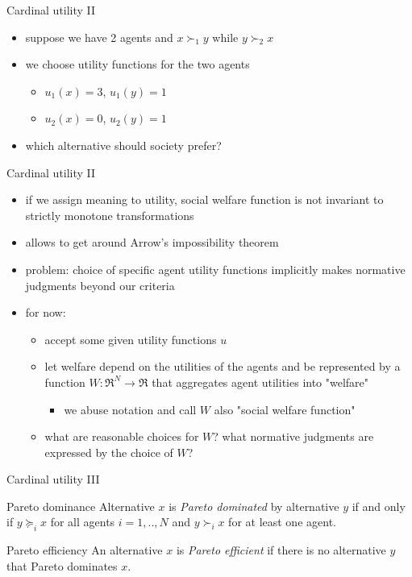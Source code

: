 \documentclass[bigger]{beamer}
\begin{document}
\begin{frame}[label={sec:org4cc0d3b}]{Cardinal utility II}
\begin{itemize}
\item suppose we have 2 agents and \(x\succ_1 y\) while \(y\succ_2 x\)
\item we choose utility functions for the two agents
\begin{itemize}
\item \(u_1(x)=3\), \(u_1(y)=1\)
\item \(u_2(x)=0\), \(u_2(y)=1\)
\end{itemize}
\item which alternative should society prefer?
\end{itemize}
\end{frame}
\begin{frame}[label={sec:org36ed370}]{Cardinal utility II}
\begin{itemize}
\item if we assign meaning to utility, social welfare function is not invariant to strictly monotone transformations
\item allows to get around Arrow's impossibility theorem
\item problem: choice of specific agent utility functions implicitly makes normative judgments beyond our criteria
\item for now:
\begin{itemize}
\item accept some given utility functions \(u\)
\item let welfare depend on the utilities of the agents and be represented by a function \(W:\Re^N\rightarrow\Re\) that aggregates agent utilities into "welfare"
\begin{itemize}
\item we abuse notation and call \(W\) also "social welfare function"
\end{itemize}
\item what are reasonable choices for \(W\)? what normative judgments are expressed by the choice of \(W\)?
\end{itemize}
\end{itemize}
\end{frame}
\begin{frame}[label={sec:org2a39269}]{Cardinal utility III}
\begin{block}{Pareto dominance}
Alternative \(x\) is \emph{Pareto dominated} by alternative \(y\) if and only if \(y\succeq_i x\) for all agents \(i=1,..,N\) and \(y\succ_i x\) for at least one agent.
\end{block}
\begin{block}{Pareto efficiency}
An alternative \(x\) is \emph{Pareto efficient} if there is no alternative \(y\) that Pareto dominates \(x\). 
\end{block}
\end{frame}
\end{document}

